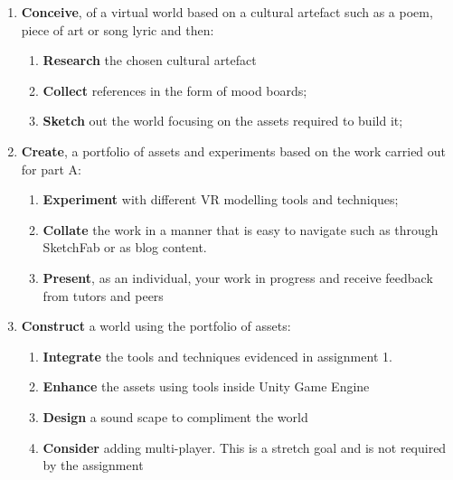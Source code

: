 \documentclass{../../fal_assignment}
\begin{document}
\begin{enumerate}[label=(\Alph*)]
    \item \textbf{Conceive}, of a virtual world based on a cultural artefact such as a poem, piece of art or song lyric and then:
    	\begin{enumerate}[label=\roman*.]
    		\item \textbf{Research} the chosen cultural artefact 
    		\item \textbf{Collect} references in the form of mood boards;
    		\item \textbf{Sketch} out the world focusing on the assets required to build it;
	\end{enumerate}
    \item \textbf{Create}, a portfolio of assets and experiments based on the work carried out for part A:
    	\begin{enumerate}[label=\roman*.]
    		\item \textbf{Experiment} with different VR modelling tools and techniques;
    		\item \textbf{Collate} the work in a manner that is easy to navigate such as through SketchFab or as blog content. 
    		\item \textbf{Present}, as an individual, your work in progress and receive feedback from tutors and peers
	\end{enumerate}
    \item \textbf{Construct} a world using the portfolio of assets:
    	\begin{enumerate}[label=\roman*.]
    		\item \textbf{Integrate} the tools and techniques evidenced in assignment 1.
    		\item \textbf{Enhance} the assets using tools inside Unity Game Engine
    		\item \textbf{Design} a sound scape to compliment the world
    		\item \textbf{Consider} adding multi-player. This is a stretch goal and is not required by the assignment
	\end{enumerate}
\end{enumerate}
\end{document}
